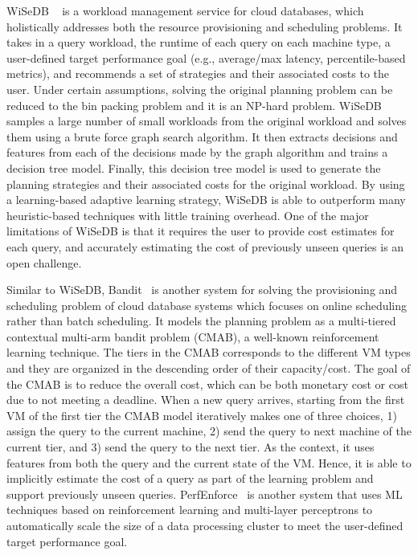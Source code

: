 WiSeDB ~\cite{wisedb} is a workload management service for cloud databases, which holistically addresses both the resource provisioning and scheduling problems.
It takes in a query workload, the runtime of each query on each machine type, a user-defined target performance goal (e.g., average/max latency, percentile-based metrics), and recommends a set of strategies and their associated costs to the user.
Under certain assumptions, solving the original planning problem can be reduced to the bin packing problem and it is an NP-hard problem.
WiSeDB samples a large number of small workloads from the original workload and solves them using a brute force graph search algorithm.
It then extracts decisions and features from each of the decisions made by the graph algorithm and trains a decision tree model.
Finally, this decision tree model is used to generate the planning strategies and their associated costs for the original workload.
By using a learning-based adaptive learning strategy, WiSeDB is able to outperform many heuristic-based techniques with little training overhead.
One of the major limitations of WiSeDB is that it requires the user to provide cost estimates for each query, and accurately estimating the cost of previously unseen queries is an open challenge.


Similar to WiSeDB, Bandit~\cite{bandit} is another system for solving the provisioning and scheduling problem of cloud database systems which focuses on online scheduling rather than batch scheduling.
It models the planning problem as a multi-tiered contextual multi-arm bandit problem (CMAB), a well-known reinforcement learning technique.
The tiers in the CMAB corresponds to the different VM types and they are organized in the descending order of their capacity/cost. 
The goal of the CMAB is to reduce the overall cost, which can be both monetary cost or cost due to not meeting a deadline.
When a new query arrives, starting from the first VM of the first tier the CMAB model iteratively makes one of three choices, 1) assign the query to the current machine, 2) send the query to next machine of the current tier, and 3) send the query to the next tier.
As the context, it uses features from both the query and the current state of the VM. Hence, it is able to implicitly estimate the cost of a query as part of the learning problem and support previously unseen queries.
PerfEnforce~\cite{perfenforce} is another system that uses ML techniques based on reinforcement learning and multi-layer perceptrons to automatically scale the size of a data processing cluster to meet the user-defined target performance goal.

